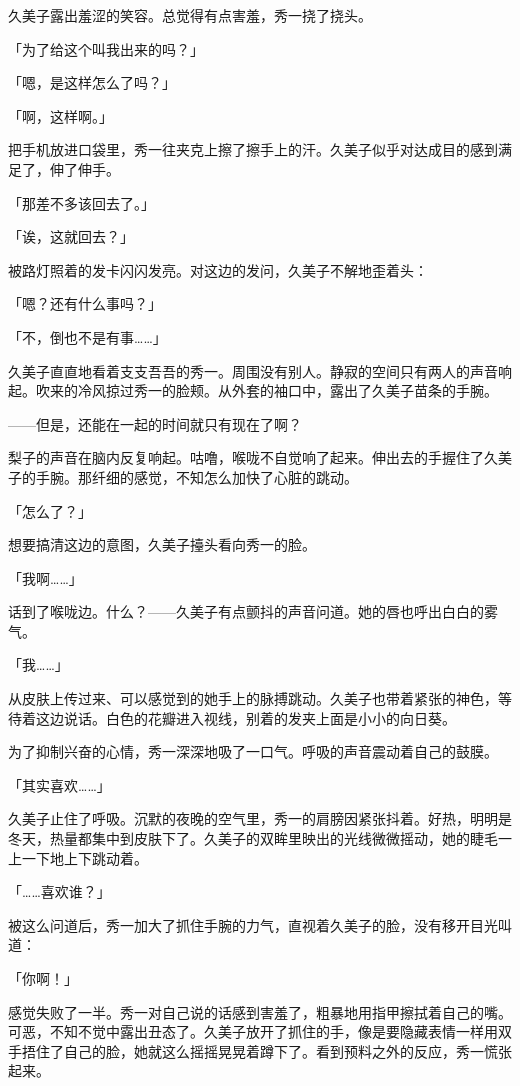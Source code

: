 \documentclass[UTF8]{ctexart}
\begin{document}
    久美子露出羞涩的笑容。总觉得有点害羞，秀一挠了挠头。

    「为了给这个叫我出来的吗？」

    「嗯，是这样怎么了吗？」

    「啊，这样啊。」

    把手机放进口袋里，秀一往夹克上擦了擦手上的汗。久美子似乎对达成目的感到满足了，伸了伸手。

    「那差不多该回去了。」

    「诶，这就回去？」

    被路灯照着的发卡闪闪发亮。对这边的发问，久美子不解地歪着头：

    「嗯？还有什么事吗？」

    「不，倒也不是有事……」

    久美子直直地看着支支吾吾的秀一。周围没有别人。静寂的空间只有两人的声音响起。吹来的冷风掠过秀一的脸颊。从外套的袖口中，露出了久美子苗条的手腕。

    ——但是，还能在一起的时间就只有现在了啊？

    梨子的声音在脑内反复响起。咕噜，喉咙不自觉响了起来。伸出去的手握住了久美子的手腕。那纤细的感觉，不知怎么加快了心脏的跳动。

    「怎么了？」

    想要搞清这边的意图，久美子擡头看向秀一的脸。

    「我啊……」

    话到了喉咙边。什么？——久美子有点颤抖的声音问道。她的唇也呼出白白的雾气。

    「我……」

    从皮肤上传过来、可以感觉到的她手上的脉搏跳动。久美子也带着紧张的神色，等待着这边说话。白色的花瓣进入视线，别着的发夹上面是小小的向日葵。

    为了抑制兴奋的心情，秀一深深地吸了一口气。呼吸的声音震动着自己的鼓膜。

    「其实喜欢……」

    久美子止住了呼吸。沉默的夜晚的空气里，秀一的肩膀因紧张抖着。好热，明明是冬天，热量都集中到皮肤下了。久美子的双眸里映出的光线微微摇动，她的睫毛一上一下地上下跳动着。

    「……喜欢谁？」

    被这么问道后，秀一加大了抓住手腕的力气，直视着久美子的脸，没有移开目光叫道：

    「你啊！」

    感觉失败了一半。秀一对自己说的话感到害羞了，粗暴地用指甲擦拭着自己的嘴。可恶，不知不觉中露出丑态了。久美子放开了抓住的手，像是要隐藏表情一样用双手捂住了自己的脸，她就这么摇摇晃晃着蹲下了。看到预料之外的反应，秀一慌张起来。
\end{document}
